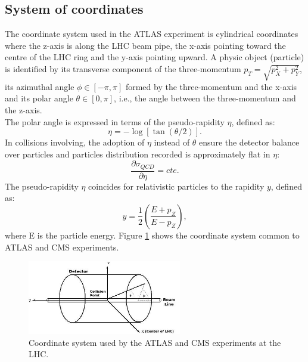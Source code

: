 \subsection{System of coordinates}
\label{chap2:ATLAS:CS}
The coordinate system used in the ATLAS experiment is cylindrical coordinates where the z-axis is along the LHC beam pipe, the x-axis pointing toward the centre of the LHC ring and the y-axis pointing upward. A physic object (particle) is identified by its transverse component of the three-momentum $p_T = \sqrt{p_X^2 + p_Y^2}$, its azimuthal angle $\phi \in [-\pi,\pi] $ formed by the three-momentum and the x-axis and its polar angle $\theta \in [0,\pi]$, i.e., the angle between the three-momentum and the z-axis. \\
The polar angle is expressed in terms of the pseudo-rapidity $\eta$, defined as:
\begin{equation}
\eta = -\log[\tan(\theta/2)].
\end{equation}
In collisions involving, the adoption of $\eta$ instead of $\theta$ ensure the detector balance over particles and particles distribution recorded is approximately flat in $\eta$:
\begin{equation}
\frac{\partial\sigma_{QCD}}{\partial\eta} = cte.
\end{equation}
The pseudo-rapidity $\eta$ coincides for relativistic particles to the rapidity $y$, defined as:
\begin{equation}
y = \frac{1}{2}(\frac{E+p_Z}{E-p_Z}),
\end{equation}
where E is the particle energy.
Figure \ref{fig:chap2:ATLAS:SYS} shows the coordinate system common to ATLAS and CMS experiments.
\begin{figure}[htbp]
    \centering
    \includegraphics[width=0.6\textwidth]{Ch2/Img/ATLAS_Sys.jpeg}
    \caption{Coordinate system used by the ATLAS and CMS experiments at the LHC.}
    \label{fig:chap2:ATLAS:SYS}
\end{figure}


